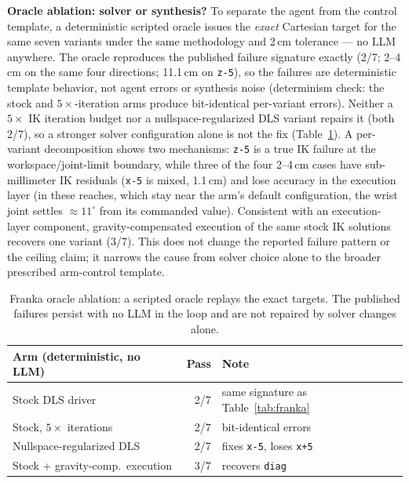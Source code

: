 \noindent\textbf{Oracle ablation: solver or synthesis?}
\label{app:franka-oracle}
To separate the agent from the control template, a deterministic
scripted oracle issues the \emph{exact} Cartesian target for the same
seven variants under the same methodology and 2\,cm tolerance --- no
LLM anywhere. The oracle reproduces the published failure signature
exactly (2/7; 2--4\,cm on the same four directions; 11.1\,cm on
\texttt{z-5}), so the failures are deterministic template behavior,
not agent errors or synthesis noise (determinism check: the stock and
$5\times$-iteration arms produce bit-identical per-variant errors).
Neither a $5\times$ IK iteration
budget nor a nullspace-regularized DLS variant repairs it (both 2/7),
so a stronger solver configuration alone is not the fix
(Table~\ref{tab:franka-oracle}). A per-variant decomposition shows two
mechanisms: \texttt{z-5} is a true IK failure at the
workspace/joint-limit boundary, while three of the four 2--4\,cm cases
have sub-millimeter IK residuals (\texttt{x-5} is mixed, 1.1\,cm) and
lose accuracy in the execution layer
(in these reaches, which stay near the arm's default configuration,
the wrist joint settles ${\approx}11^\circ$ from its commanded value).
Consistent with an execution-layer component, gravity-compensated
execution of the same stock IK solutions recovers one variant (3/7).
This does not change the reported failure pattern or the ceiling
claim; it narrows the cause from solver choice alone to the broader
prescribed arm-control template.

\begin{table}[H]
\centering
\footnotesize
\setlength{\tabcolsep}{4pt}
\renewcommand{\arraystretch}{0.9}
\begin{tabular}{lrl}
\toprule
\textbf{Arm (deterministic, no LLM)} & \textbf{Pass} & \textbf{Note} \\
\midrule
Stock DLS driver          & 2/7 & same signature as Table~\ref{tab:franka} \\
Stock, $5\times$ iterations & 2/7 & bit-identical errors \\
Nullspace-regularized DLS & 2/7 & fixes \texttt{x-5}, loses \texttt{x+5} \\
Stock + gravity-comp.\ execution & 3/7 & recovers \texttt{diag} \\
\bottomrule
\end{tabular}
\caption{Franka oracle ablation: a scripted oracle replays the exact
targets. The published failures persist with no LLM in the loop and
are not repaired by solver changes alone.}
\label{tab:franka-oracle}
\end{table}

